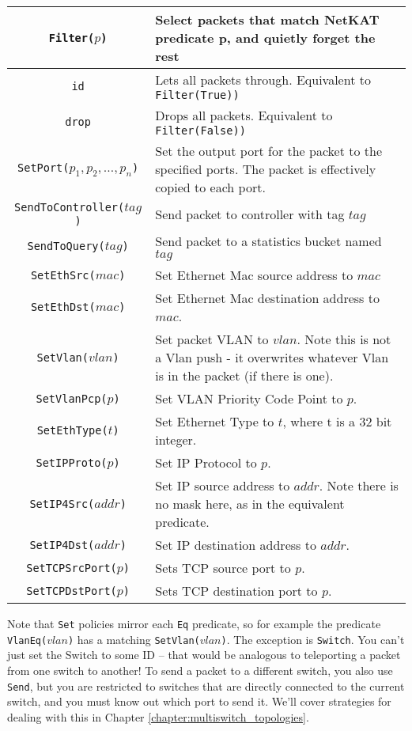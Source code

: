 \bigskip
\begin{tabularx}{\linewidth}{|c|X|}
\hline\hline
\texttt{Filter($p$)} & Select packets that match NetKAT predicate p, and quietly forget the rest  
\\ \hline
\texttt{id} & Lets all packets through.  Equivalent to \texttt{Filter(True))}  
\\ \hline
\texttt{drop} & Drops all packets.  Equivalent to \texttt{Filter(False))}  
\\ \hline
\texttt{SetPort($p_1, p_2, \ldots, p_n$)} & Set the output port for the packet to the specified ports.
The packet is effectively copied to each port.    
\\ \hline
\texttt{SendToController($tag$)} & Send packet to controller with tag $tag$    
\\ \hline
\texttt{SendToQuery($tag$)} & Send packet to a statistics bucket named $tag$    
\\ \hline
\texttt{SetEthSrc($mac$)} & Set Ethernet Mac source address to $mac$
\\ \hline
\texttt{SetEthDst($mac$)} & Set Ethernet Mac destination address to $mac$.
\\ \hline
\texttt{SetVlan($vlan$)} & Set packet VLAN to $vlan$.  Note this is not a Vlan push - it overwrites whatever 
Vlan is in the packet (if there is one).  
\\ \hline
\texttt{SetVlanPcp($p$)} & Set VLAN Priority Code Point to $p$.
\\ \hline
\texttt{SetEthType($t$)} & Set Ethernet Type to $t$, where t is a 32 bit integer.
\\ \hline
\texttt{SetIPProto($p$)} & Set IP Protocol to $p$.    
\\ \hline
\texttt{SetIP4Src($addr$)} & Set IP source address to $addr$.  
Note there is no mask here, as in the equivalent predicate.  
\\ \hline
\texttt{SetIP4Dst($addr$)} & Set IP destination address to $addr$.  
\\ \hline
\texttt{SetTCPSrcPort($p$)} & Sets TCP source port to $p$.
\\ \hline
\texttt{SetTCPDstPort($p$)} & Sets TCP destination port to $p$.  
\\ \hline\hline
\end{tabularx}
\bigskip

Note that \texttt{Set} policies mirror each \texttt{Eq} predicate, so for example the 
predicate \texttt{VlanEq($vlan$)} has a matching
\texttt{SetVlan($vlan$)}.
The exception is \texttt{Switch}.  
You can't just set the Switch to some ID -- that would be analogous to teleporting a packet from one 
switch to another!
To send a packet to a different switch, you also use \texttt{Send}, but you are restricted to switches that are directly
connected to the current switch, and you must know out which port to send it.
We'll cover strategies for dealing with this in Chapter \ref{chapter:multiswitch_topologies}.
 
